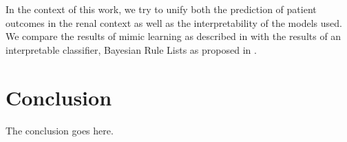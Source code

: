 \documentclass[conference,compsoc]{IEEEtran}
\begin{document}
In the context of this work, we try to unify both the prediction of patient outcomes in the renal context as well as the interpretability of the models used.
We compare the results of mimic learning as described in \cite{Che2016} with the results of an interpretable classifier, Bayesian Rule Lists as proposed in \cite{Yang2016}.

\section{Conclusion}
The conclusion goes here.




\end{document}
